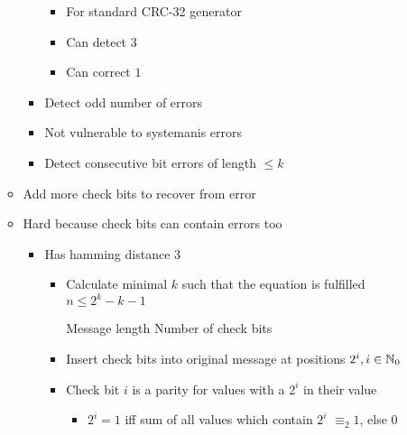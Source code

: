 \begin{itemize}
\begin{itemize}
\begin{itemize}
                        \begin{itemize}
                            \item For standard CRC-32 generator
                            \item Can detect $3$
                            \item Can correct $1$
                        \end{itemize}
                    \item Detect odd number of errors
                    \item Not vulnerable to systemanis errors
                    \item Detect consecutive bit errors of length $\le k$
                \end{itemize}
        \end{itemize}
        \begin{itemize}
            \item Add more check bits to recover from error
            \item Hard because check bits can contain errors too
                \begin{itemize}
                    \item Has hamming distance $3$
                        \begin{itemize}
                            \item Calculate minimal $k$ such that the equation is fulfilled $n \le 2^k - k - 1$
                                \begin{itemize}
                                     Message length
                                     Number of check bits
                                \end{itemize}
                            \item Insert check bits into original message at positions $2^i, i \in \mathbb{N}_0$
                            \item Check bit $i$ is a parity for values with a $2^i$ in their value
                                \begin{itemize}
                                    \item $2^i = 1$ iff sum of all values which contain $2^i$ $\equiv_2 1$, else $0$
                                \end{itemize}
                        \end{itemize}

\end{itemize}
\end{itemize}
\end{itemize}
